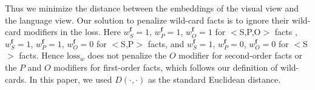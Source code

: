 \documentclass[runningheads]{llncs}
\begin{document}
Thus we minimize the distance between the embeddings of the visual view and the language view. Our solution to penalize wild-card facts is to ignore their wild-card modifiers in the loss. Here $w_S^{\mathbf{f}}=1$, $w_P^{\mathbf{f}}=1$, $w_O^{\mathbf{f}}=1$ for $<$S,P,O$>$ facts , $w_S^{\mathbf{f}}=1$, $w_P^{\mathbf{f}}=1$, $w_O^{\mathbf{f}}=0$ for $<$S,P$>$ facts, and $w_S^{\mathbf{f}}=1$, $w_P^{\mathbf{f}}=0$, $w_O^{\mathbf{f}}=0$ for $<$S$>$ facts.  Hence $\mbox{loss}_w$ does not penalize the $O$ modifier for second-order facts or the $P$ and $O$ modifiers for first-order facts, which follows our definition of wild-cards.  In this paper, we used $D(\cdot,\cdot)$ as the standard Euclidean distance. %
\end{document}
